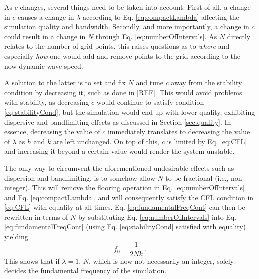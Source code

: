 \documentclass[dvipsnames, reprint]{JASA}
\def\SWcomment[#1]{\textcolor{Bittersweet}{#1}}
\begin{document}
%
%
As $c$ changes, several things need to be taken into account. First of all, a change in $c$ causes a change in $\lambda$ according to Eq. \eqref{eq:compactLambda} affecting the simulation quality and bandwidth. Secondly, and more importantly, a change in $c$ could result in a change in $N$ through Eq. \eqref{eq:numberOfIntervals}. As $N$ directly relates to the number of grid points, this raises questions as to \textit{where} and especially \textit{how} one would add and remove points to the grid according to the now-dynamic wave speed.

A solution to the latter is to set and fix $N$ and tune $c$ away from the stability condition by decreasing it, such as done in [REF]. This would avoid problems with stability, as decreasing $c$ would continue to satisfy condition \eqref{eq:stabilityCond}, but the simulation would end up with lower quality, exhibiting dispersive and bandlimiting effects as discussed in Section \ref{sec:quality}. In essence, decreasing the value of $c$ immediately translates to decreasing the value of $\lambda$ as $h$ and $k$ are left unchanged. On top of this, $c$ is limited by Eq. \eqref{eq:CFL} and increasing it beyond a certain value would render the system unstable.

The only way to circumvent the aforementioned undesirable effects such as dispersion and bandlimiting, is to somehow allow $N$ to be fractional \SWcomment[(i.e., non-integer)]. This will remove the flooring operation in Eq. \eqref{eq:numberOfIntervals} and Eq. \eqref{eq:compactLambda}, and will consequently satisfy the CFL condition in \eqref{eq:CFL} with equality at all times. Eq. \eqref{eq:fundamentalFreqCont} can then be rewritten in terms of $N$ by substituting Eq. \eqref{eq:numberOfIntervals} into Eq. \eqref{eq:fundamentalFreqCont} (using Eq. \eqref{eq:stabilityCond} satisfied with equality) yielding
\begin{equation}\label{eq:fundamentalFreq}
    f_0 = \frac{1}{2Nk}\ .
\end{equation}
This shows that if $\lambda = 1$, $N$, which is now not necessarily an integer, solely decides the fundamental frequency of the simulation. 
\end{document}
